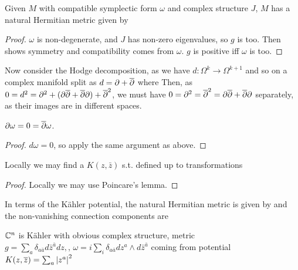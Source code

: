 \documentclass{article}
\begin{document}
\begin{prop}
	Given $M$ with  compatible symplectic form $\omega$ and complex structure $J$, $M$ has a natural Hermitian metric given by 
\end{prop}
\begin{proof}
	$\omega$ is non-degenerate, and $J$ has non-zero eigenvalues, so $g$ is too. Then 
shows symmetry and compatibility comes from $\omega$. $g$ is positive iff $\omega$ is too. 
\end{proof}

Now consider the Hodge decomposition, as we have $d : \Omega^k \to \Omega^{k+1}$ and so on a complex manifold split as $d = \partial + \overline{\partial}$ where 
Then, as $0 = d^2 = \partial^2 + (\partial \overline{\partial} + \overline{\partial} \partial) + \overline{\partial}^2$, we must have  $0 = \partial^2  = \overline{\partial}^2 = \partial\overline{\partial} + \overline{\partial} \partial$ separately, as their images are in different spaces. 
\begin{lemma}
	$\partial \omega = 0 = \overline{\partial} \omega$. 
\end{lemma}
\begin{proof}
	$d \omega=0$, so apply the same argument as above. 
\end{proof}
\begin{corollary}
	Locally we may find a  $K(z,\bar{z})$ s.t. 
defined up to transformations 
\end{corollary}
\begin{proof}
	Locally we may use Poincare's lemma. 
\end{proof}

\begin{prop}
	In terms of the K\"ahler potential, the natural Hermitian metric is given by 
and the non-vanishing connection components are 
\end{prop}

\begin{example}
	$\mathbb{C}^n$ is K\"ahler with obvious complex structure, metric $g = \sum_a \delta_{a\bar{a}} d\bar{z}^{\bar{a}}dz, ,\, \omega = i \sum_i \delta_{a\bar{a}} dz^a \wedge d\bar{z}^{\bar{a}}$ coming from potential $K(z,\overline{z}) = \sum_a \left\lvert z^a \right\rvert^2 $
\end{example}
\end{document}
